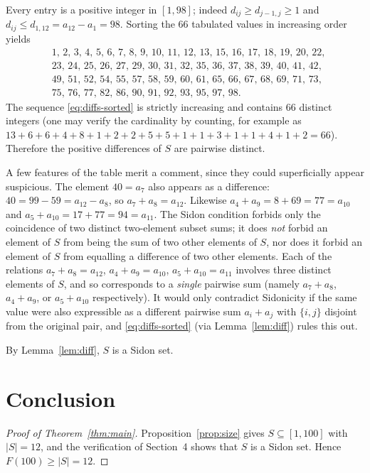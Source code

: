 \documentclass[a4paper,11pt]{amsart}
\theoremstyle{plain}
\theoremstyle{definition}
\begin{document}
Every entry is a positive integer in $[1,98]$; indeed
$d_{ij}\geq d_{j-1,j}\geq 1$ and $d_{ij}\leq d_{1,12}=a_{12}-a_1=98$.
Sorting the $66$ tabulated values in increasing order yields
\begin{equation}\label{eq:diffs-sorted}
\begin{aligned}
&1,\,2,\,3,\,4,\,5,\,6,\,7,\,8,\,9,\,10,\,11,\,12,\,13,\,15,\,16,\,17,\,18,\,19,\,20,\,22,\\
&23,\,24,\,25,\,26,\,27,\,29,\,30,\,31,\,32,\,35,\,36,\,37,\,38,\,39,\,40,\,41,\,42,\\
&49,\,51,\,52,\,54,\,55,\,57,\,58,\,59,\,60,\,61,\,65,\,66,\,67,\,68,\,69,\,71,\,73,\\
&75,\,76,\,77,\,82,\,86,\,90,\,91,\,92,\,93,\,95,\,97,\,98.
\end{aligned}
\end{equation}
The sequence \eqref{eq:diffs-sorted} is strictly increasing and
contains $66$ distinct integers (one may verify the cardinality by
counting, for example as $13+6+6+4+8+1+2+2+5+5+1+1+3+1+1+4+1+2=66$).
Therefore the positive differences of $S$ are pairwise distinct.

A few features of the table merit a comment, since they could
superficially appear suspicious. The element $40=a_7$ also appears as
a difference: $40=99-59=a_{12}-a_8$, so $a_7+a_8=a_{12}$. Likewise
$a_4+a_9=8+69=77=a_{10}$ and $a_5+a_{10}=17+77=94=a_{11}$. The Sidon
condition forbids only the coincidence of two distinct two\nobreakdash-element
subset sums; it does \emph{not} forbid an element of $S$ from being the
sum of two other elements of $S$, nor does it forbid an element of $S$
from equalling a difference of two other elements. Each of the
relations $a_7+a_8=a_{12}$, $a_4+a_9=a_{10}$, $a_5+a_{10}=a_{11}$
involves three distinct elements of $S$, and so corresponds to a
\emph{single} pairwise sum (namely $a_7+a_8$, $a_4+a_9$, or
$a_5+a_{10}$ respectively). It would only contradict Sidonicity if the
same value were also expressible as a different pairwise sum
$a_i+a_j$ with $\{i,j\}$ disjoint from the original pair, and
\eqref{eq:diffs-sorted} (via Lemma~\ref{lem:diff}) rules this out.

By Lemma~\ref{lem:diff}, $S$ is a Sidon set.

\section{Conclusion}

\begin{proof}[Proof of Theorem~\ref{thm:main}]
Proposition~\ref{prop:size} gives $S\subseteq[1,100]$ with $|S|=12$, and
the verification of Section~4 shows that $S$ is a Sidon set. Hence
$F(100)\geq|S|=12$.
\end{proof}
\end{document}
